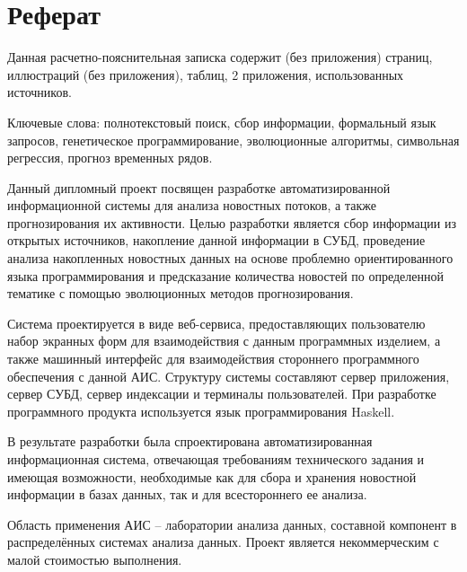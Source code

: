 \section*{Реферат}

Данная расчетно-пояснительная записка содержит \pageref{LastPage} (без приложения) страниц,  иллюстраций (без приложения),  таблиц, 2 приложения,  использованных источников.

Ключевые слова: полнотекстовый поиск, сбор информации, формальный язык запросов, генетическое программирование, эволюционные алгоритмы, символьная регрессия, прогноз временных рядов.

Данный дипломный проект посвящен разработке автоматизированной информационной системы для анализа новостных потоков, а также прогнозирования их активности. Целью разработки является сбор информации из открытых источников, накопление данной информации в СУБД, проведение анализа накопленных новостных данных на основе проблемно ориентированного языка программирования и предсказание количества новостей по определенной тематике с помощью эволюционных методов прогнозирования.

Система проектируется в виде веб-сервиса, предоставляющих пользователю набор экранных форм для взаимодействия с данным программных изделием, а также машинный интерфейс для взаимодействия стороннего программного обеспечения с данной АИС. Структуру системы составляют сервер приложения, сервер СУБД, сервер индексации и терминалы пользователей. При разработке программного продукта используется язык программирования Haskell.

В результате разработки была спроектирована автоматизированная информационная система, отвечающая требованиям технического задания и имеющая возможности, необходимые как для сбора и хранения новостной информации в базах данных, так и для всестороннего ее анализа.

Область применения АИС -- лаборатории анализа данных, составной компонент в распределённых системах анализа данных. Проект является некоммерческим с малой стоимостью выполнения.